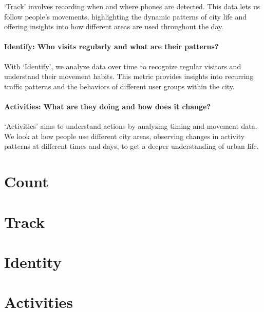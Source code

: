 \documentclass[
  letterpaper,
]{scrbook}
\begin{document}
`Track' involves recording when and where phones are detected. This data
lets us follow people's movements, highlighting the dynamic patterns of
city life and offering insights into how different areas are used
throughout the day.

\subsubsection*{\texorpdfstring{\textbf{Identify: Who visits regularly
and what are their
patterns?}}{Identify: Who visits regularly and what are their patterns?}}\label{identify-who-visits-regularly-and-what-are-their-patterns}

With `Identify', we analyze data over time to recognize regular visitors
and understand their movement habits. This metric provides insights into
recurring traffic patterns and the behaviors of different user groups
within the city.

\subsubsection*{\texorpdfstring{\textbf{Activities: What are they doing
and how does it
change?}}{Activities: What are they doing and how does it change?}}\label{activities-what-are-they-doing-and-how-does-it-change}

`Activities' aims to understand actions by analyzing timing and movement
data. We look at how people use different city areas, observing changes
in activity patterns at different times and days, to get a deeper
understanding of urban life.

\chapter{Count}\label{count}

\chapter{Track}\label{track}

\chapter{Identity}\label{identity}

\chapter{Activities}\label{activities}
\end{document}
